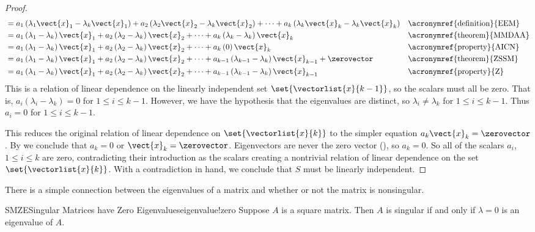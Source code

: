 \begin{proof}
\begin{align*}
%
&=a_1\left(\lambda_1\vect{x}_1-\lambda_k\vect{x}_1\right)+
a_2\left(\lambda_2\vect{x}_2-\lambda_k\vect{x}_2\right)+
\cdots+
a_k\left(\lambda_k\vect{x}_k-\lambda_k\vect{x}_k\right)
&&\text{\acronymref{definition}{EEM}}\\
%
&=a_1\left(\lambda_1-\lambda_k\right)\vect{x}_1+
a_2\left(\lambda_2-\lambda_k\right)\vect{x}_2+
\cdots+
a_k\left(\lambda_k-\lambda_k\right)\vect{x}_k
&&\text{\acronymref{theorem}{MMDAA}}\\
%
&=a_1\left(\lambda_1-\lambda_k\right)\vect{x}_1+
a_2\left(\lambda_2-\lambda_k\right)\vect{x}_2+
\cdots+
a_k\left(0\right)\vect{x}_k
&&\text{\acronymref{property}{AICN}}\\
%
&=a_1\left(\lambda_1-\lambda_k\right)\vect{x}_1+
a_2\left(\lambda_2-\lambda_k\right)\vect{x}_2+
\cdots+
a_{k-1}\left(\lambda_{k-1}-\lambda_k\right)\vect{x}_{k-1}+
\zerovector
&&\text{\acronymref{theorem}{ZSSM}}\\
%
&=a_1\left(\lambda_1-\lambda_k\right)\vect{x}_1+
a_2\left(\lambda_2-\lambda_k\right)\vect{x}_2+
\cdots+
a_{k-1}\left(\lambda_{k-1}-\lambda_k\right)\vect{x}_{k-1}
&&\text{\acronymref{property}{Z}}
%
\end{align*}
%
This is a relation of linear dependence on the linearly independent set $\set{\vectorlist{x}{k-1}}$, so the scalars must all be zero.  That is, $a_i\left(\lambda_i-\lambda_k\right)=0$ for $1\leq i\leq k-1$.  However, we have the hypothesis that the eigenvalues are distinct, so $\lambda_i\neq\lambda_k$ for $1\leq i\leq k-1$.  Thus $a_i=0$ for $1\leq i\leq k-1$.\par
%
This reduces the original relation of linear dependence on $\set{\vectorlist{x}{k}}$ to the simpler equation $a_k\vect{x}_k=\zerovector$.  By  we conclude that $a_k=0$ or $\vect{x}_k=\zerovector$.  Eigenvectors are never the zero vector (), so $a_k=0$.  So all of the scalars $a_i$, $1\leq i\leq k$ are zero, contradicting their introduction as the scalars creating a nontrivial relation of linear dependence on the set $\set{\vectorlist{x}{k}}$.  With a contradiction in hand, we conclude that $S$ must be linearly independent.
%
\end{proof}
%
There is a simple connection between the eigenvalues of a matrix and whether or not the matrix is nonsingular.
%
\begin{theorem}{SMZE}{Singular Matrices have Zero Eigenvalues}{eigenvalue!zero}
Suppose $A$ is a square matrix.  Then $A$ is singular if and only if $\lambda=0$ is an eigenvalue of $A$.
\end{theorem}
